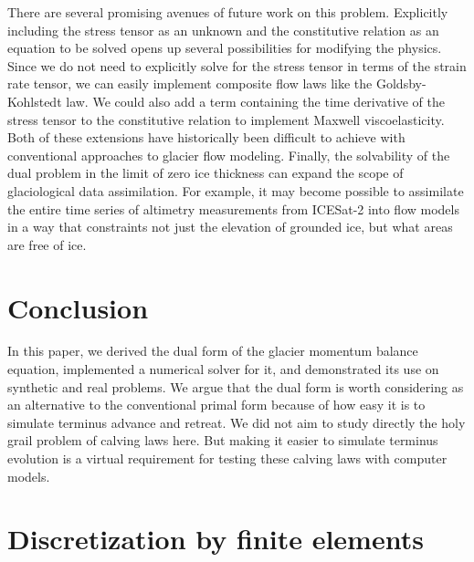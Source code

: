 \documentclass[twocolumn,letterpaper]{igs}
\begin{document}
There are several promising avenues of future work on this problem.
Explicitly including the stress tensor as an unknown and the constitutive relation as an equation to be solved opens up several possibilities for modifying the physics.
Since we do not need to explicitly solve for the stress tensor in terms of the strain rate tensor, we can easily implement composite flow laws like the Goldsby-Kohlstedt law.
We could also add a term containing the time derivative of the stress tensor to the constitutive relation to implement Maxwell viscoelasticity.
Both of these extensions have historically been difficult to achieve with conventional approaches to glacier flow modeling.
Finally, the solvability of the dual problem in the limit of zero ice thickness can expand the scope of glaciological data assimilation.
For example, it may become possible to assimilate the entire time series of altimetry measurements from ICESat-2 into flow models in a way that constraints not just the elevation of grounded ice, but what areas are free of ice.


\section{Conclusion}

In this paper, we derived the dual form of the glacier momentum balance equation, implemented a numerical solver for it, and demonstrated its use on synthetic and real problems.
We argue that the dual form is worth considering as an alternative to the conventional primal form because of how easy it is to simulate terminus advance and retreat.
We did not aim to study directly the holy grail problem of calving laws here.
But making it easier to simulate terminus evolution is a virtual requirement for testing these calving laws with computer models.



\appendix

\section{Discretization by finite elements}
\label{app:discretization}
\end{document}

